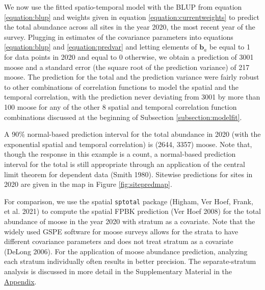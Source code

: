 \documentclass[smallextended]{svjour3}       %
\begin{document}
We now use the fitted spatio-temporal model with the BLUP from equation
\ref{equation:blup} and weights given in equation
\ref{equation:currentweights} to predict the total abundance across all
sites in the year 2020, the most recent year of the survey. Plugging in
estimates of the covariance parameters into equations
\ref{equation:blup} and \ref{equation:predvar} and letting elements of
\(\mathbf{b}_a\) be equal to 1 for data points in 2020 and equal to 0
otherwise, we obtain a prediction of 3001 moose and a standard error
(the square root of the prediction variance) of 217 moose. The
prediction for the total and the prediction variance were fairly robust
to other combinations of correlation functions to model the spatial and
the temporal correlation, with the prediction never deviating from 3001
by more than 100 moose for any of the other 8 spatial and temporal
correlation function combinations discussed at the beginning of
Subsection \ref{subsection:modelfit}.

A 90\% normal-based prediction interval for the total abundance in 2020
(with the exponential spatial and temporal correlation) is (2644, 3357)
moose. Note that, though the response in this example is a count, a
normal-based prediction interval for the total is still appropriate
through an application of the central limit theorem for dependent data
(Smith 1980). Sitewise predictions for sites in 2020 are given in the
map in Figure \ref{fig:sitepredmap}.

For comparison, we use the spatial \texttt{sptotal} package (Higham, Ver
Hoef, Frank, et al. 2021) to compute the spatial FPBK prediction (Ver
Hoef 2008) for the total abundance of moose in the year 2020 with
stratum as a covariate. Note that the widely used GSPE software for
moose surveys allows for the strata to have different covariance
parameters and does not treat stratum as a covariate (DeLong 2006). For
the application of moose abundance prediction, analyzing each stratum
individually often results in better precision. The separate-stratum
analysis is discussed in more detail in the Supplementary Material in
the \protect\hyperlink{appendix}{Appendix}.
\end{document}

